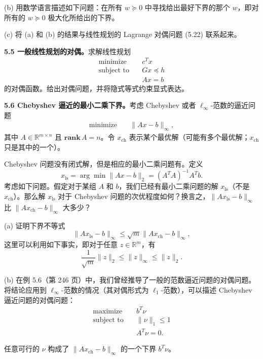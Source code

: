 \documentclass[UTF8, 12pt, fontset=fandol, oneside]{ctexart}
\begin{document}
(b) 用数学语言描述如下问题：在所有 $w\succeq 0$ 中寻找给出最好下界的那个 $w$，即对所有的 $w\succeq 0$ 极大化所给出的下界。

(c) 将 (a) 和 (b) 的结果与线性规划的 Lagrange 对偶问题 (5.22) 联系起来。

\noindent\textbf{5.5 一般线性规划的对偶。}\quad 求解线性规划
\[
\begin{aligned}
\text{minimize}\quad & c^Tx\\
\text{subject to}\quad & Gx\preceq h\\
& Ax=b
\end{aligned}
\]
的对偶函数。给出对偶问题，并将隐式等式约束显式表达。

\noindent\textbf{5.6 Chebyshev 逼近的最小二乘下界。}\quad 考虑 Chebyshev 或者 $\ell_\infty$-范数的逼近问题
\begin{equation}
\begin{aligned}
\text{minimize}\quad & \|Ax-b\|_\infty,
\end{aligned}
\tag{5.103}
\end{equation}
其中 $A\in\mathbb{R}^{m\times n}$ 且 $\mathbf{rank}\,A=n$。令 $x_{\mathrm{ch}}$ 表示某个最优解（可能有多个最优解；$x_{\mathrm{ch}}$ 只是其中的一个）。

Chebyshev 问题没有闭式解，但是相应的最小二乘问题有。定义
\[
x_{\mathrm{ls}}=\arg\min \|Ax-b\|_2=(A^TA)^{-1}A^Tb.
\]
考虑如下问题。假定对于某组 $A$ 和 $b$，我们已经有最小二乘问题的解 $x_{\mathrm{ls}}$（不是 $x_{\mathrm{ch}}$）。那么解 $x_{\mathrm{ls}}$ 对于 Chebyshev 问题的次优程度如何？换言之，$\|Ax_{\mathrm{ls}}-b\|_\infty$ 比 $\|Ax_{\mathrm{ch}}-b\|_\infty$ 大多少？

(a) 证明下界不等式
\[
\|Ax_{\mathrm{ls}}-b\|_\infty\leq \sqrt{m}\|Ax_{\mathrm{ch}}-b\|_\infty,
\]
这里可以利用如下事实，即对于任意 $z\in\mathbb{R}^m$，有
\[
\frac{1}{\sqrt{m}}\|z\|_2\leq \|z\|_\infty\leq \|z\|_2.
\]

(b) 在例 5.6（第 246 页）中，我们曾经推导了一般的范数逼近问题的对偶问题。将结论应用到 $\ell_\infty$-范数的情况（其对偶形式为 $\ell_1$-范数），可以描述 Chebyshev 逼近问题的对偶问题：
\begin{equation}
\begin{aligned}
\text{maximize}\quad & b^T\nu\\
\text{subject to}\quad & \|\nu\|_1\leq 1\\
& A^T\nu=0.
\end{aligned}
\tag{5.104}
\end{equation}

任意可行的 $\nu$ 构成了 $\|Ax_{\mathrm{ch}}-b\|_\infty$ 的一个下界 $b^T\nu$。
\end{document}
